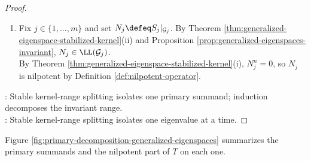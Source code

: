 \begin{theorem}
\begin{proof}
\begin{enumerate}[label=(\roman*)]
\begin{enumerate}[label=(\alph*)]
Hence $\mathbf{v}=\mathbf{u}\in\mathcal{G}_{\lambda_j}(T|_{\mathcal{U}})$. Therefore the generalized eigenspaces are equal, and items (b) and (e) prove (i).
\end{enumerate}
\item[$(ii)$] Fix $j\in\{1,\ldots,m\}$ and set $N_j\defeq S_j|_{\mathcal{G}_j}$. By Theorem \ref{thm:generalized-eigenspace-stabilized-kernel}(ii) and Proposition \ref{prop:generalized-eigenspaces-invariant}, $N_j\in\LL(\mathcal{G}_j)$.\\
By Theorem \ref{thm:generalized-eigenspace-stabilized-kernel}(i), $N_j^n=0$, so $N_j$ is nilpotent by Definition \ref{def:nilpotent-operator}.
\end{enumerate}
: Stable kernel-range splitting isolates one primary summand; induction decomposes the invariant range.\\
: Stable kernel-range splitting isolates one eigenvalue at a time.
\end{proof}
\end{theorem}

Figure \ref{fig:primary-decomposition-generalized-eigenspaces} summarizes the primary summands and the nilpotent part of $T$ on each one.

\begin{illustrationfigure}[H]
  \centering
  
  \caption{Primary decomposition: on $\mathcal{G}_{\lambda_j}(T)$, $T=\lambda_j I$ plus nilpotent.}
  \label{fig:primary-decomposition-generalized-eigenspaces}
\end{illustrationfigure}

